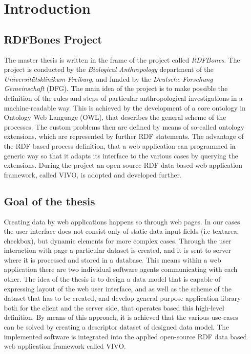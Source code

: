 \chapter{Introduction}


\section{RDFBones Project}

The master thesis is written in the frame of the project called \textit{RDFBones}. The project is conducted by the \textit{Biological Anthropology} department of the \textit{Universitätsklinikum Freiburg}, and funded by the \textit{Deutsche Forschung Gemeinschaft} (DFG). The main idea of the project is to make possible the definition of the rules and steps of particular anthropological investigations in a machine-readable way. This is achieved by the development of a core ontology in Ontology Web Language (OWL), that describes the general scheme of the processes. The custom problems then are defined by means of so-called ontology extensions, which are represented by further RDF statements. The advantage of the RDF based process definition, that a web application can programmed in generic way so that it adapts its interface to the various cases by querying the extensions. During the project an open-source RDF data based web application framework, called VIVO, is adopted and developed further.

\section{Goal of the thesis}

Creating data by web applications happens so through web pages. In our cases the user interface does not consist only of static data input fields (i.e textarea, checkbox), but dynamic elements for more complex cases. Through the user interaction with page a particular dataset is created, and it is sent to server where it is processed and stored in a database. This means within a web application there are two individual software agents communicating with each other. The idea of the thesis is to design a data model that is capable of expressing layout of the web user interface, and as well as the scheme of the dataset that has to be created, and develop general purpose application library both for the client and the server side, that operates based this high-level definition. By means of this approach, it is achieved that the various use-cases can be solved by creating a descriptor dataset of designed data model. The implemented software is integrated into the applied open-source RDF data based web application framework called VIVO.

